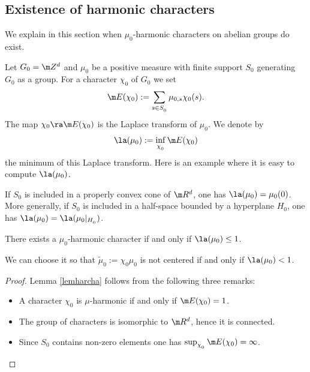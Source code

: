 \subsection{Existence of harmonic characters}
\label{secharcha}

\bq
We explain in this section when $\mu_0$\nobreakdash-har\-monic characters
on abelian groups do exist.
\eq

Let $G_0=\m Z^d$ and $\mu_0$ be a
positive measure with finite support $S_0$ generating $G_0$ as a group.
For a character $\chi_0$ of $G_0$ we set
\[
\m E(\chi_0):=\sum_{s\in S_{_0}}\mu_{0,s}\chi_0(s).
\]
The map $\chi_0\ra\m E(\chi_0)$ is the Laplace transform of $\mu_0$.
We denote by
\begin{equation}
\label{eqnlamuoo}
\la(\mu_0):=\inf_{\chi_{_0}} \m E(\chi_0)
\end{equation}
the minimum of this Laplace transform.
Here is an example where it is easy to compute $\la(\mu_0)$.

\begin{Rem}
\label{remlammuo}
If $S_0$ is included in a properly convex cone of $\m R^d$, one has \hbox{$\la(\mu_0)=\mu_0(0)$}.
More generally, if $S_0$ is included in a half-space bounded by a hyperplane $H_0$, one has $\la(\mu_0)=\la(\mu_0|_{H_{_0}})$.
\end{Rem}

\skpt
\begin{Lem}
\label{lemharcha}
\begin{enumeratea}
\item\label{lemharchaa}
There exists a $\mu_0$-harmonic character if and only if
$\la(\mu_0)\leq 1$.

\item\label{lemharchab}
We can choose it so that $\widetilde{\mu}_0:=\chi_0\mu_0$ is not centered if and only if
$\la(\mu_0)< 1$.
\end{enumeratea}
\end{Lem}

\begin{proof} Lemma \ref{lemharcha} follows from the following three remarks:
\begin{itemize}
\item
A character $\chi_0$ is $\mu$-harmonic if and only if $\m E(\chi_0)=1$.\item
The group of characters is isomorphic to $\m R^d$, hence it is connected.
\item
Since $S_0$ contains non-zero elements one has $\sup_{\chi_{_0}}\m E(\chi_0)=\infty$.\qedhere
\end{itemize}
\end{proof}

